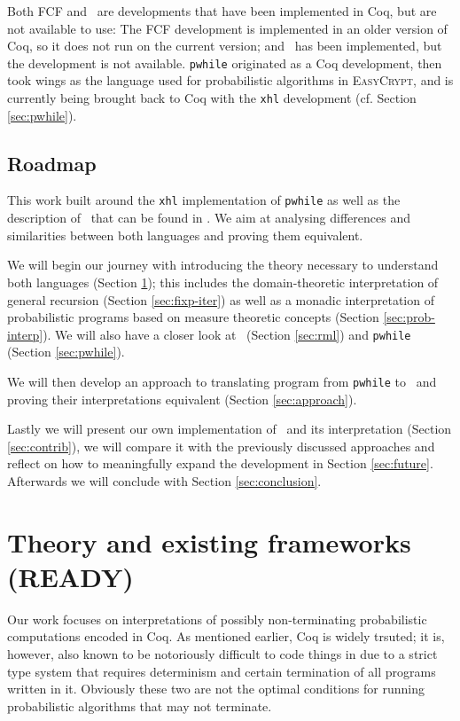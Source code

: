 \documentclass[11pt, leqno, titlepage]{article}
\theoremstyle{definition}
\begin{document}
Both FCF and \rml\ are developments that have been implemented in Coq, but are not
available to use: The FCF development is implemented in an older version of Coq, so
it does not run on the current version; and \rml\ has been implemented, but the
development is not available. 
\texttt{pwhile} originated as a Coq development, then took wings as the language used
for probabilistic algorithms in \textsc{EasyCrypt}, and is currently being brought
back to Coq with the \texttt{xhl} development (cf. Section \ref{sec:pwhile}).

\subsection{Roadmap}
This work built around the \texttt{xhl} implementation of \texttt{pwhile} as well as
the description of \rml\ that can be found in \cite{rml-paper}. We aim at analysing
differences and similarities between both languages and proving them equivalent. 

We will begin our journey with introducing the theory necessary to understand both
languages (Section \ref{sec:theory}); this includes the domain-theoretic
interpretation of general recursion (Section \ref{sec:fixp-iter}) as well as a
monadic interpretation of probabilistic programs based on measure theoretic concepts
(Section \ref{sec:prob-interp}). We will also have a closer look at \rml\ (Section
\ref{sec:rml}) and \texttt{pwhile} (Section \ref{sec:pwhile}).

We will then develop an approach to translating program from \texttt{pwhile} to \rml\
and proving their interpretations equivalent (Section \ref{sec:approach}).

Lastly we will present our own implementation of \rml\ and its interpretation
(Section \ref{sec:contrib}), we will compare it with the previously discussed
approaches and reflect on how to meaningfully expand the development in Section
\ref{sec:future}. Afterwards we will conclude with Section \ref{sec:conclusion}.


\section{Theory and existing frameworks (READY)} 
\label{sec:theory}

Our work focuses on interpretations of possibly non-terminating probabilistic
computations encoded in Coq. As mentioned earlier, Coq is widely trsuted; it is,
however, also known to be notoriously difficult to code things in due to a strict
type system that requires determinism and certain termination of all programs written
in it. Obviously these two are not the optimal conditions for running probabilistic
algorithms that may not terminate.
\end{document}
